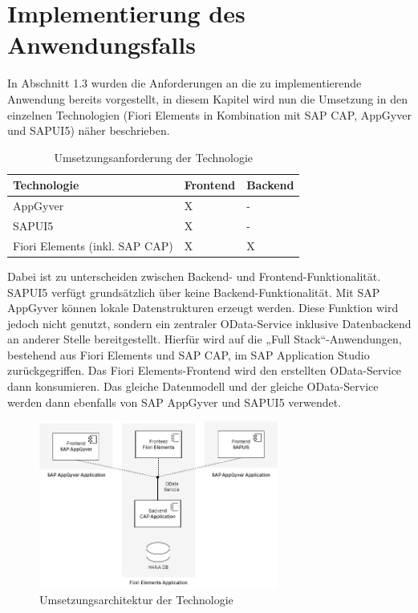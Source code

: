 
\chapter{Implementierung des Anwendungsfalls} \label{IM}


In Abschnitt 1.3 wurden die Anforderungen an die zu implementierende Anwendung bereits vorgestellt, in diesem Kapitel wird nun die Umsetzung in den einzelnen Technologien (Fiori Elements in Kombination mit SAP CAP, AppGyver und SAPUI5) näher beschrieben. 

\begin{table}[htbp]
  \centering
	\begin{tabular}{|l|l|l|} 
	\hline 
	\rowcolor{gray!40}
     Technologie&Frontend&Backend\\
	\hline  
	AppGyver&X&-\\
	\hline
	SAPUI5&X&-\\
	\hline
	Fiori Elements (inkl. SAP CAP)&X&X\\
	\hline
	\end{tabular}
  \caption{Umsetzungsanforderung der Technologie} 
\end{table}

Dabei ist zu unterscheiden zwischen Backend- und Frontend-Funktionalität. SAPUI5 verfügt grundsätzlich über keine Backend-Funktionalität. Mit SAP AppGyver können lokale Datenstrukturen erzeugt werden. Diese Funktion wird jedoch nicht genutzt, sondern ein zentraler OData-Service inklusive Datenbackend an anderer Stelle bereitgestellt. Hierfür wird auf die „Full Stack“-Anwendungen, bestehend aus Fiori Elements und SAP CAP, im SAP Application Studio zurückgegriffen. Das Fiori Elements-Frontend wird den erstellten OData-Service dann konsumieren. Das gleiche Datenmodell und der gleiche OData-Service werden dann ebenfalls von SAP AppGyver und SAPUI5 verwendet.  

\begin{figure}[htbp]
 \centering
 \includegraphics[width=0.7\textwidth]{Bilder/architecture/apps_architektur.jpg}
 \caption{Umsetzungsarchitektur der Technologie}
\end{figure}

